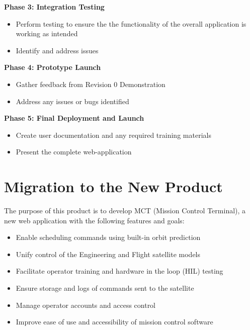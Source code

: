 \documentclass[12pt]{article}
\begin{document}
\textbf{Phase 3: Integration Testing}
\begin{itemize}
    \item Perform testing to ensure the the functionality of the overall application is working as intended
    \item Identify and address issues
\end{itemize}

\textbf{Phase 4: Prototype Launch}
\begin{itemize}
    \item Gather feedback from Revision 0 Demonstration
    \item Address any issues or bugs identified
\end{itemize}

\textbf{Phase 5: Final Deployment and Launch}
\begin{itemize}
    \item Create user documentation and any required training materials
    \item Present the complete web-application 
\end{itemize}

\section{Migration to the New Product}
The purpose of this product is to develop MCT (Mission Control Terminal), a new web application with the following features and goals:
\begin{itemize}
    \item  Enable scheduling commands using built-in orbit prediction
    \item Unify control of the Engineering and Flight satellite models
    \item Facilitate operator training and hardware in the loop (HIL) testing
    \item Ensure storage and logs of commands sent to the satellite
    \item Manage operator accounts and access control
    \item Improve ease of use and accessibility of mission control software
\end{itemize}
\end{document}
